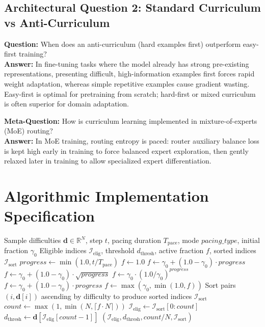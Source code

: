 \documentclass[11pt,a4paper]{article}
\theoremstyle{definition}
\begin{document}
\subsection{Architectural Question 2: Standard Curriculum vs Anti-Curriculum}
\textbf{Question:} When does an anti-curriculum (hard examples first) outperform easy-first training?\\
\textbf{Answer:} In fine-tuning tasks where the model already has strong pre-existing representations, presenting difficult, high-information examples first forces rapid weight adaptation, whereas simple repetitive examples cause gradient wasting. Easy-first is optimal for pretraining from scratch; hard-first or mixed curriculum is often superior for domain adaptation.

\textbf{Meta-Question:} How is curriculum learning implemented in mixture-of-experts (MoE) routing?\\
\textbf{Answer:} In MoE training, routing entropy is paced: router auxiliary balance loss is kept high early in training to force balanced expert exploration, then gently relaxed later in training to allow specialized expert differentiation.

\section{Algorithmic Implementation Specification}

\begin{algorithm}[H]
\caption{Curriculum Pacing and Batch Eligibility Filter}
\begin{algorithmic}[1]
\Require Sample difficulties $\mathbf{d} \in \mathbb{R}^N$, step $t$, pacing duration $T_{\text{pace}}$, mode $pacing\_type$, initial fraction $\gamma_0$
\Ensure Eligible indices $\mathcal{I}_{\text{elig}}$, threshold $d_{\text{thresh}}$, active fraction $f$, sorted indices $\mathcal{I}_{\text{sort}}$
\State $progress \gets \min(1.0, t / T_{\text{pace}})$
    \State $f \gets 1.0$
    \State $f \gets \gamma_0 + (1.0 - \gamma_0) \cdot progress$
    \State $f \gets \gamma_0 + (1.0 - \gamma_0) \cdot \sqrt{progress}$
    \State $f \gets \gamma_0 \cdot (1.0 / \gamma_0)^{progress}$
\Else
    \State $f \gets \gamma_0 + (1.0 - \gamma_0) \cdot progress$
\EndIf
\State $f \gets \max(\gamma_0, \min(1.0, f))$
\State Sort pairs $(i, \mathbf{d}[i])$ ascending by difficulty to produce sorted indices $\mathcal{I}_{\text{sort}}$
\State $count \gets \max(1, \min(N, \lceil f \cdot N \rceil))$
\State $\mathcal{I}_{\text{elig}} \gets \mathcal{I}_{\text{sort}}[0 : count]$
\State $d_{\text{thresh}} \gets \mathbf{d}[\mathcal{I}_{\text{elig}}[count - 1]]$
\State \Return $(\mathcal{I}_{\text{elig}}, d_{\text{thresh}}, count / N, \mathcal{I}_{\text{sort}})$
\end{algorithmic}
\end{algorithm}
\end{document}
